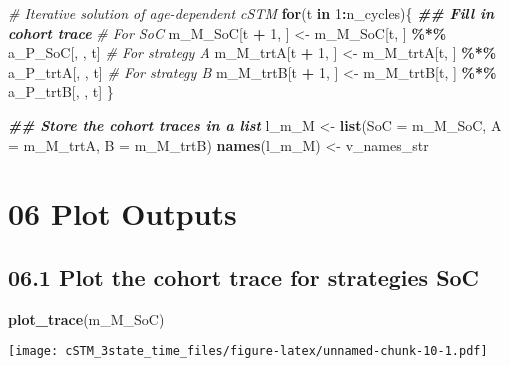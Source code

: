 \documentclass[
]{article}
\newenvironment{Shaded}{\begin{snugshade}}{\end{snugshade}}
\newcommand{\AttributeTok}[1]{\textcolor[rgb]{0.13,0.29,0.53}{#1}}
\newcommand{\CommentTok}[1]{\textcolor[rgb]{0.56,0.35,0.01}{\textit{#1}}}
\newcommand{\ControlFlowTok}[1]{\textcolor[rgb]{0.13,0.29,0.53}{\textbf{#1}}}
\newcommand{\DecValTok}[1]{\textcolor[rgb]{0.00,0.00,0.81}{#1}}
\newcommand{\DocumentationTok}[1]{\textcolor[rgb]{0.56,0.35,0.01}{\textbf{\textit{#1}}}}
\newcommand{\FunctionTok}[1]{\textcolor[rgb]{0.13,0.29,0.53}{\textbf{#1}}}
\newcommand{\NormalTok}[1]{#1}
\newcommand{\OtherTok}[1]{\textcolor[rgb]{0.56,0.35,0.01}{#1}}
\newcommand{\SpecialCharTok}[1]{\textcolor[rgb]{0.81,0.36,0.00}{\textbf{#1}}}
\begin{document}
\begin{Shaded}
\begin{Highlighting}[]
\CommentTok{\# Iterative solution of age{-}dependent cSTM}
\ControlFlowTok{for}\NormalTok{(t }\ControlFlowTok{in} \DecValTok{1}\SpecialCharTok{:}\NormalTok{n\_cycles)\{}
  \DocumentationTok{\#\# Fill in cohort trace}
  \CommentTok{\# For SoC}
\NormalTok{  m\_M\_SoC[t }\SpecialCharTok{+} \DecValTok{1}\NormalTok{, ]  }\OtherTok{\textless{}{-}}\NormalTok{ m\_M\_SoC[t, ]  }\SpecialCharTok{\%*\%}\NormalTok{ a\_P\_SoC[, , t]}
  \CommentTok{\# For strategy A}
\NormalTok{  m\_M\_trtA[t }\SpecialCharTok{+} \DecValTok{1}\NormalTok{, ] }\OtherTok{\textless{}{-}}\NormalTok{ m\_M\_trtA[t, ] }\SpecialCharTok{\%*\%}\NormalTok{ a\_P\_trtA[, , t]}
  \CommentTok{\# For strategy B}
\NormalTok{  m\_M\_trtB[t }\SpecialCharTok{+} \DecValTok{1}\NormalTok{, ] }\OtherTok{\textless{}{-}}\NormalTok{ m\_M\_trtB[t, ] }\SpecialCharTok{\%*\%}\NormalTok{ a\_P\_trtB[, , t]}
\NormalTok{\}}

\DocumentationTok{\#\# Store the cohort traces in a list }
\NormalTok{l\_m\_M }\OtherTok{\textless{}{-}} \FunctionTok{list}\NormalTok{(}\AttributeTok{SoC =}\NormalTok{  m\_M\_SoC,}
              \AttributeTok{A   =}\NormalTok{  m\_M\_trtA,}
              \AttributeTok{B   =}\NormalTok{  m\_M\_trtB)}
\FunctionTok{names}\NormalTok{(l\_m\_M) }\OtherTok{\textless{}{-}}\NormalTok{ v\_names\_str}
\end{Highlighting}
\end{Shaded}

\hypertarget{plot-outputs}{%
\section{06 Plot Outputs}\label{plot-outputs}}

\hypertarget{plot-the-cohort-trace-for-strategies-soc}{%
\subsection{06.1 Plot the cohort trace for strategies
SoC}\label{plot-the-cohort-trace-for-strategies-soc}}

\begin{Shaded}
\begin{Highlighting}[]
\FunctionTok{plot\_trace}\NormalTok{(m\_M\_SoC) }
\end{Highlighting}
\end{Shaded}

\texttt{[image: cSTM\_3state\_time\_files/figure-latex/unnamed-chunk-10-1.pdf]}
\end{document}
